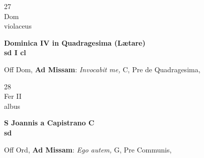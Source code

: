 \documentclass[10pt, openany]{book}
\begin{document}
        \begin{center}
            \begin{minipage}{3.5in}
                \vspace{2em}
                \begin{minipage}{0.5in}
                    {\Huge 27} \\
                    {\normalsize Dom} \\
                    {\normalsize violaceus}
                \end{minipage}
                \begin{minipage}{3.0in}
                    \textbf{ \large Dominica IV in Quadragesima (Lætare) \\
                    \textnormal{\normalsize sd I cl}} \\ 
                \end{minipage}
                \begin{justify}Off Dom, \textbf{Ad Missam}: \textit{Invocabit me,} C, Pre de Quadragesima,   
                \end{justify}
            \end{minipage}
        \end{center}
    
        \begin{center}
            \begin{minipage}{3.5in}
                \vspace{2em}
                \begin{minipage}{0.5in}
                    {\Huge 28} \\
                    {\normalsize Fer II} \\
                    {\normalsize albus}
                \end{minipage}
                \begin{minipage}{3.0in}
                    \textbf{ \large S Joannis a Capistrano C \\
                    \textnormal{\normalsize sd}} \\ 
                \end{minipage}
                \begin{justify}Off Ord, \textbf{Ad Missam}: \textit{Ego autem,} G, Pre Communis,   
                \end{justify}
            \end{minipage}
        \end{center}
    
\end{document}
